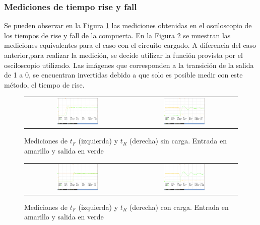 \subsubsection{Mediciones de tiempo rise y fall}
Se pueden observar en la Figura \ref{fig:TRAN_NOLOAD} las mediciones obtenidas en el osciloscopio de los tiempos de rise y fall  de la compuerta. En la Figura \ref{fig:TRAN_LOAD} se muestran las mediciones equivalentes para el caso con el circuito cargado.
A diferencia del caso anterior,para realizar la medici\'on, se decide utilizar la funci\'on provista por el osciloscopio utilizado. Las im\'agenes que corresponden a la transici\'on de la salida de 1 a 0, se encuentran invertidas debido a que solo es posible medir con este m\'etodo, el tiempo de rise.
\begin{figure}[H]
    \centering
    \begin{tabular}{c c}
        \includegraphics[width=0.4\textwidth]{../EJ4/Recursos/TRAN_NOLOAD_FALL} &
        \includegraphics[width=0.4\textwidth]{../EJ4/Recursos/TRAN_NOLOAD_RISE}
    \end{tabular}
    \caption{Mediciones de $t_F$ (izquierda) y $t_R$ (derecha) sin carga. Entrada en amarillo y salida en verde}
    \label{fig:TRAN_NOLOAD}
\end{figure} 
\begin{figure}[H]
    \centering
    \begin{tabular}{c c}
        \includegraphics[width=0.4\textwidth]{../EJ4/Recursos/TRAN_LOAD_FALL} &
        \includegraphics[width=0.4\textwidth]{../EJ4/Recursos/TRAN_LOAD_RISE}
    \end{tabular}
    \caption{Mediciones de $t_F$ (izquierda) y $t_R$ (derecha) con carga. Entrada en amarillo y salida en verde}
    \label{fig:TRAN_LOAD}
\end{figure}
